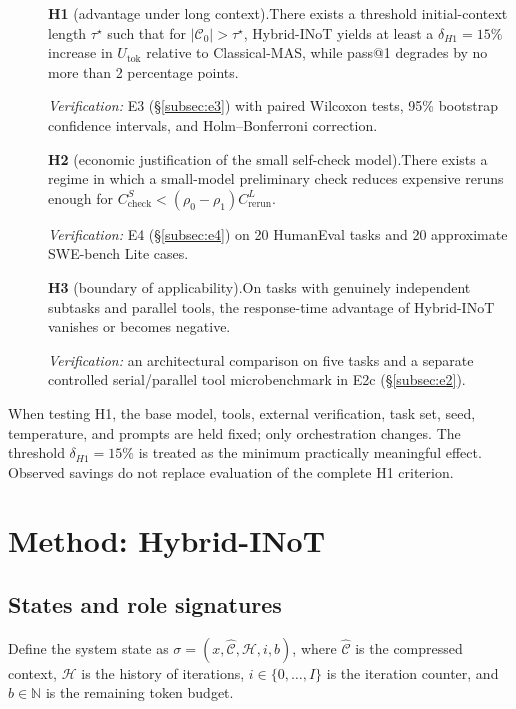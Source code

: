 \begin{description}
\item[]\textbf{H1} (advantage under long context).\quad There exists a threshold initial-context length $\tau^\star$ such that for $|\mathcal{C}_0|>\tau^\star$, \textrm{Hybrid-INoT} yields at least a $\delta_{H1}=15\%$ increase in $U_{\text{tok}}$ relative to \textrm{Classical-MAS}, while pass@1 degrades by no more than 2 percentage points.\par\emph{Verification:} E3 (§\ref{subsec:e3}) with paired Wilcoxon tests, 95\% bootstrap confidence intervals, and Holm--Bonferroni correction.
\item[]\textbf{H2} (economic justification of the small self-check model).\quad There exists a regime in which a small-model preliminary check reduces expensive reruns enough for $C_{\text{check}}^S<(\rho_0-\rho_1)C_{\text{rerun}}^L$.\par\emph{Verification:} E4 (§\ref{subsec:e4}) on 20 HumanEval tasks and 20 approximate SWE-bench Lite cases.
\item[]\textbf{H3} (boundary of applicability).\quad On tasks with genuinely independent subtasks and parallel tools, the response-time advantage of Hybrid-INoT vanishes or becomes negative.\par\emph{Verification:} an architectural comparison on five tasks and a separate controlled serial/parallel tool microbenchmark in E2c (§\ref{subsec:e2}).
\end{description}

When testing H1, the base model, tools, external verification, task set, seed, temperature, and prompts are held fixed; only orchestration changes. The threshold $\delta_{H1}=15\%$ is treated as the minimum practically meaningful effect. Observed savings do not replace evaluation of the complete H1 criterion.

\section{Method: Hybrid-INoT}\label{sec:method}

\subsection{States and role signatures}

Define the system state as $\sigma=(x,\hat{\mathcal{C}},\mathcal{H},i,b)$, where $\hat{\mathcal{C}}$ is the compressed context, $\mathcal{H}$ is the history of iterations, $i\in\{0,\dots,I\}$ is the iteration counter, and $b\in\mathbb{N}$ is the remaining token budget.


